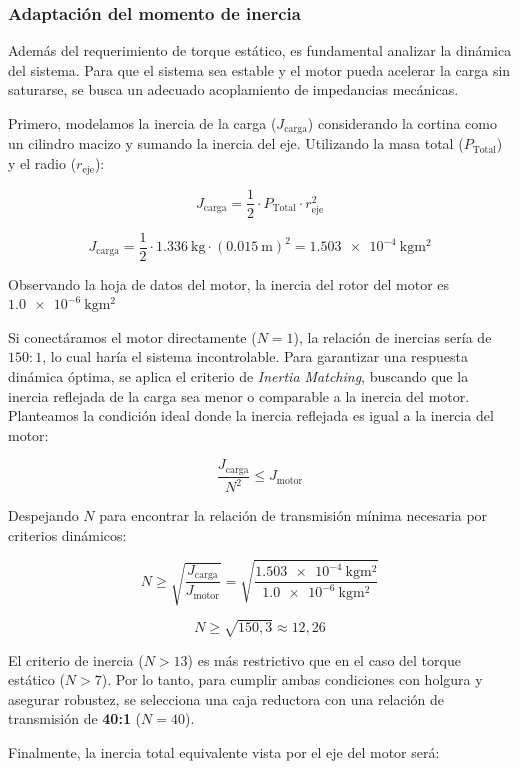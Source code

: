 \subsubsection{Adaptación del momento de inercia}

Además del requerimiento de torque estático, es fundamental analizar la dinámica del sistema. Para que el sistema sea estable y el motor pueda acelerar la carga sin saturarse, se busca un adecuado acoplamiento de impedancias mecánicas.

Primero, modelamos la inercia de la carga ($J_{\text{carga}}$) considerando la cortina como un cilindro macizo y sumando la inercia del eje. Utilizando la masa total ($P_{\text{Total}}$) y el radio ($r_{\text{eje}}$):

\[
J_{\text{carga}} = \frac{1}{2} \cdot P_{\text{Total}} \cdot r_{\text{eje}}^2
\]

\[
J_{\text{carga}} = \frac{1}{2} \cdot \SI{1,336}{\kilogram} \cdot (\SI{0,015}{\meter})^2 = \SI{1,503e-4}{\kilogram\meter\squared}
\]

Observando la hoja de datos del motor, la inercia del rotor del motor es $\SI{1,0e-6}{\kilogram\meter\squared}$


Si conectáramos el motor directamente ($N=1$), la relación de inercias sería de $150:1$, lo cual haría el sistema incontrolable. Para garantizar una respuesta dinámica óptima, se aplica el criterio de \textit{Inertia Matching}, buscando que la inercia reflejada de la carga sea menor o comparable a la inercia del motor. Planteamos la condición ideal donde la inercia reflejada es igual a la inercia del motor:

\[
\frac{J_{\text{carga}}}{N^2} \leq J_{\text{motor}}
\]

Despejando $N$ para encontrar la relación de transmisión mínima necesaria por criterios dinámicos:

\[
N \geq \sqrt{\frac{J_{\text{carga}}}{J_{\text{motor}}}} = \sqrt{\frac{\SI{1,503e-4}{\kilogram\meter\squared}}{\SI{1,0e-6}{\kilogram\meter\squared}}}
\]

\[
N \geq \sqrt{150,3} \approx 12,26
\]

El criterio de inercia ($N>13$) es más restrictivo que en el caso del torque estático ($N>7$). Por lo tanto, para cumplir ambas condiciones con holgura y asegurar robustez, se selecciona una caja reductora con una relación de transmisión de \textbf{40:1} ($N=40$).

Finalmente, la inercia total equivalente vista por el eje del motor será:

